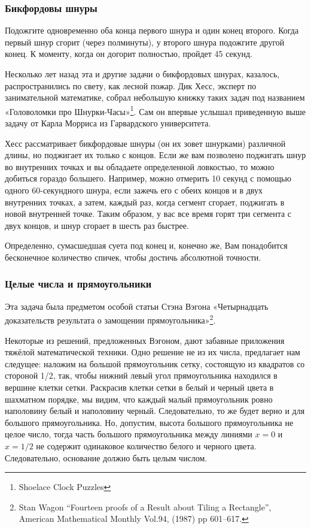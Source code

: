 \subsubsection*{Бикфордовы шнуры} %

Подожгите одновременно оба конца первого шнура и один конец второго. Когда первый шнур сгорит (через полминуты),  у второго шнура подожгите другой конец.  К моменту, когда он догорит полностью, пройдет 45 секунд.\heart


Несколько лет назад эта и другие задачи о бикфордовых шнурах, казалось, распространились по свету, как лесной пожар.
Дик Хесс, эксперт  по занимательной математике, 
собрал небольшую книжку таких задач 
под названием «Головоломки про Шнурки-Часы»\footnote{Shoelace Clock Puzzles}. 
Сам он впервые услышал приведенную выше задачу от Карла Морриса из Гарвардского университета.

Хесс рассматривает бикфордовые шнуры (он их зовет шнурками)  различной длины, но поджигает их только с концов.
Если же вам позволено поджигать шнур во внутренних точках и вы обладаете определенной ловкостью, то можно добиться гораздо большего. Например, можно отмерить 10 секунд с помощью одного 60-секундного шнура, если зажечь его с обеих концов и в двух внутренних точках, а затем, каждый раз, когда сегмент сгорает,  поджигать в новой  внутренней точке.
Таким образом, у вас все время горят  три сегмента  с двух концов,  и шнур сгорает в шесть раз быстрее.

Определенно, сумасшедшая суета под конец и, конечно же,
Вам понадобится бесконечное количество спичек, чтобы достичь абсолютной точности.






\subsubsection*{Целые числа и прямоугольники} %

Эта задача была предметом особой %
статьи Стэна Вэгона %
«Четырнадцать доказательств результата о замощении прямоугольника»\footnote{Stan Wagon “Fourteen proofs of a Result about Tiling a Rectangle”, American Mathematical Monthly  Vol.94, (1987) pp 601--617.}.


Некоторые из решений, предложенных Вэгоном, дают забавные приложения тяжёлой математической техники.
Одно решение не из их числа, предлагает нам следущее:
наложим на большой прямоугольник сетку,  состоящую из квадратов со стороной 1/2,  так, чтобы нижний  левый угол прямоугольника находился в вершине клетки сетки.  
Раскрасив клетки сетки в белый и черный цвета в шахматном порядке, 
мы видим, что каждый малый прямоугольник ровно наполовину белый и наполовину черный. Следовательно, то же будет верно и для большого  прямоугольника.
Но, допустим, высота большого  прямоугольника не  целое число, тогда часть 
большого  прямоугольника между линиями  $x=0$ и   $x=1/2$  не содержит одинаковое количество белого и черного цвета. 
Следовательно, основание должно быть целым числом.\heart


